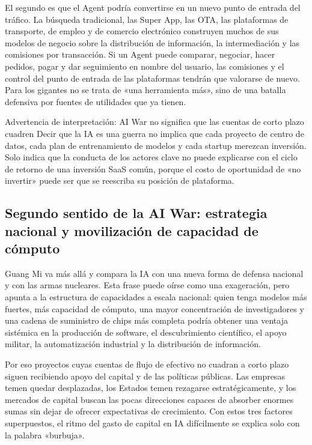 El segundo es que el Agent podría convertirse en un nuevo punto de entrada del tráfico. La búsqueda tradicional, las Super App, las OTA, las plataformas de transporte, de empleo y de comercio electrónico construyen muchos de sus modelos de negocio sobre la distribución de información, la intermediación y las comisiones por transacción. Si un Agent puede comparar, negociar, hacer pedidos, pagar y dar seguimiento en nombre del usuario, las comisiones y el control del punto de entrada de las plataformas tendrán que valorarse de nuevo. Para los gigantes no se trata de «una herramienta más», sino de una batalla defensiva por fuentes de utilidades que ya tienen.

\begin{warningbox}{Advertencia de interpretación: AI War no significa que las cuentas de corto plazo cuadren}
Decir que la IA es una guerra no implica que cada proyecto de centro de datos, cada plan de entrenamiento de modelos y cada startup merezcan inversión. Solo indica que la conducta de los actores clave no puede explicarse con el ciclo de retorno de una inversión SaaS común, porque el costo de oportunidad de «no invertir» puede ser que se reescriba su posición de plataforma.
\end{warningbox}

\subsection{Segundo sentido de la AI War: estrategia nacional y movilización de capacidad de cómputo}

Guang Mi va más allá y compara la IA con una nueva forma de defensa nacional y con las armas nucleares. Esta frase puede oírse como una exageración, pero apunta a la estructura de capacidades a escala nacional: quien tenga modelos más fuertes, más capacidad de cómputo, una mayor concentración de investigadores y una cadena de suministro de chips más completa podría obtener una ventaja sistémica en la producción de software, el descubrimiento científico, el apoyo militar, la automatización industrial y la distribución de información.

Por eso proyectos cuyas cuentas de flujo de efectivo no cuadran a corto plazo siguen recibiendo apoyo del capital y de las políticas públicas. Las empresas temen quedar desplazadas, los Estados temen rezagarse estratégicamente, y los mercados de capital buscan las pocas direcciones capaces de absorber enormes sumas sin dejar de ofrecer expectativas de crecimiento. Con estos tres factores superpuestos, el ritmo del gasto de capital en IA difícilmente se explica solo con la palabra «burbuja».

